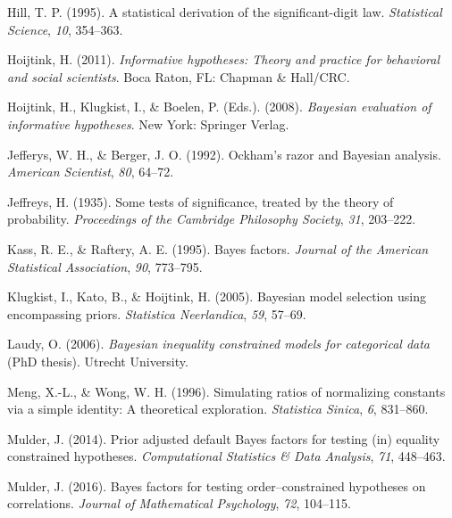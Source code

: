 \documentclass[
  english,
  man,floatsintext]{apa6}
\begin{document}
\leavevmode\hypertarget{ref-hill1995statistical}{}%
Hill, T. P. (1995). A statistical derivation of the significant-digit law. \emph{Statistical Science}, \emph{10}, 354--363.

\leavevmode\hypertarget{ref-hoijtink2011informative}{}%
Hoijtink, H. (2011). \emph{Informative hypotheses: Theory and practice for behavioral and social scientists}. Boca Raton, FL: Chapman \& Hall/CRC.

\leavevmode\hypertarget{ref-hoijtink2008bayesian}{}%
Hoijtink, H., Klugkist, I., \& Boelen, P. (Eds.). (2008). \emph{Bayesian evaluation of informative hypotheses}. New York: Springer Verlag.

\leavevmode\hypertarget{ref-jefferysberger1992}{}%
Jefferys, W. H., \& Berger, J. O. (1992). Ockham's razor and Bayesian analysis. \emph{American Scientist}, \emph{80}, 64--72.

\leavevmode\hypertarget{ref-jeffreys1935some}{}%
Jeffreys, H. (1935). Some tests of significance, treated by the theory of probability. \emph{Proceedings of the Cambridge Philosophy Society}, \emph{31}, 203--222.

\leavevmode\hypertarget{ref-kass1995bayes}{}%
Kass, R. E., \& Raftery, A. E. (1995). Bayes factors. \emph{Journal of the American Statistical Association}, \emph{90}, 773--795.

\leavevmode\hypertarget{ref-klugkist2005bayesian}{}%
Klugkist, I., Kato, B., \& Hoijtink, H. (2005). Bayesian model selection using encompassing priors. \emph{Statistica Neerlandica}, \emph{59}, 57--69.

\leavevmode\hypertarget{ref-laudy2006bayesian}{}%
Laudy, O. (2006). \emph{Bayesian inequality constrained models for categorical data} (PhD thesis). Utrecht University.

\leavevmode\hypertarget{ref-meng1996simulating}{}%
Meng, X.-L., \& Wong, W. H. (1996). Simulating ratios of normalizing constants via a simple identity: A theoretical exploration. \emph{Statistica Sinica}, \emph{6}, 831--860.

\leavevmode\hypertarget{ref-mulder2014prior}{}%
Mulder, J. (2014). Prior adjusted default Bayes factors for testing (in) equality constrained hypotheses. \emph{Computational Statistics \& Data Analysis}, \emph{71}, 448--463.

\leavevmode\hypertarget{ref-mulder2016bayes}{}%
Mulder, J. (2016). Bayes factors for testing order--constrained hypotheses on correlations. \emph{Journal of Mathematical Psychology}, \emph{72}, 104--115.
\end{document}
